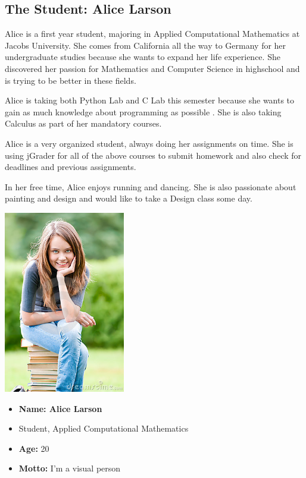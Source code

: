 \subsection{The Student: Alice Larson}

Alice is a first year student, majoring in Applied Computational Mathematics  at Jacobs University.  She comes from California all the way to Germany for her undergraduate studies because she wants to expand her life experience.
She discovered her passion for  Mathematics and Computer Science in highschool and is trying to be better in these fields.

Alice is taking both Python Lab and C Lab this semester because she wants to gain as much knowledge about programming as possible . She is also taking Calculus as part of her mandatory courses.

Alice is a very organized student, always doing her assignments on time. She is using jGrader for all of the above courses to submit homework and also check for deadlines and previous assignments.

In her free time, Alice enjoys running and dancing. She is also passionate about painting and design and would like to take a Design class some day.


\begin{center}
  \includegraphics[width=200px]{personas/alice.jpg}
\end{center}

\begin{itemize}
  \item \textbf{Name: Alice Larson}
  \item Student, Applied Computational Mathematics
  \item \textbf{Age:} 20
  \item \textbf{Motto:} I'm a visual person
\end{itemize}



